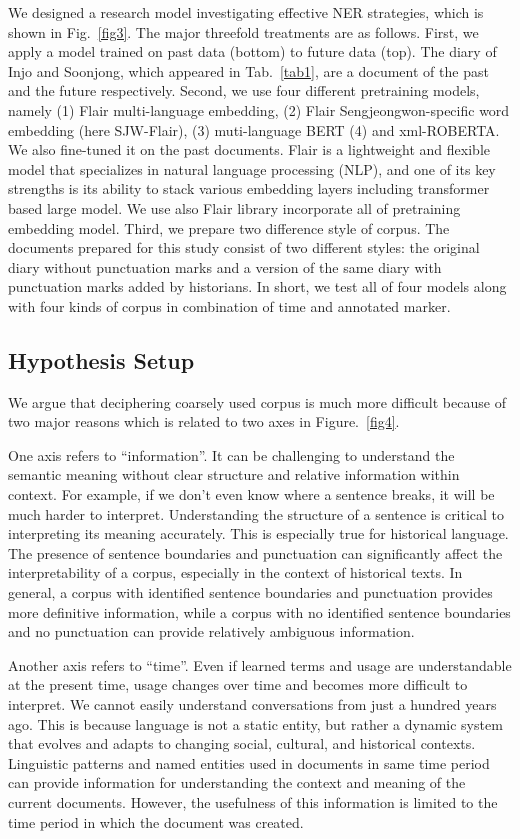 \documentclass[sigconf]{acmart}
\begin{document}
We designed a research model investigating effective NER strategies, which is shown in Fig.~\ref{fig3}. The major threefold treatments are as follows. First, we apply a model trained on past data (bottom) to future data (top). The diary of Injo and Soonjong, which appeared in Tab.~\ref{tab1}, are a document of the past and the future respectively.  Second, we use four different pretraining models, namely (1) Flair multi-language embedding, (2) Flair Sengjeongwon-specific word embedding (here SJW-Flair), (3) muti-language BERT (4) and xml-ROBERTA. We also fine-tuned it on the past documents. Flair is a lightweight and flexible model that specializes in natural language processing (NLP), and one of its key strengths is its ability to stack various embedding layers including transformer based large model. We use also Flair library incorporate all of pretraining embedding model. Third, we prepare two difference style of corpus. The documents prepared for this study consist of two different styles: the original diary without punctuation marks and a version of the same diary with punctuation marks added by historians. 
In short, we test all of four models along with four kinds of corpus in combination of time and annotated marker.



\subsection{Hypothesis Setup}

We argue that deciphering coarsely used corpus is much more difficult because of two major reasons which is related to two axes in Figure.~\ref{fig4}. 

One axis refers to “information”. It can be challenging to understand the semantic meaning without clear structure and relative information within context.   For example, if we don't even know where a sentence breaks, it will be much harder to interpret. Understanding the structure of a sentence is critical to interpreting its meaning accurately. This is especially true for historical language.  The presence of sentence boundaries and punctuation can significantly affect the interpretability of a corpus, especially in the context of historical texts. In general, a corpus with identified sentence boundaries and punctuation provides more definitive information, while a corpus with no identified sentence boundaries and no punctuation can provide relatively ambiguous information.

Another axis refers to “time”. Even if learned terms and usage are understandable at the present time, usage changes over time and becomes more difficult to interpret. We cannot easily understand conversations from just a hundred years ago. This is because language is not a static entity, but rather a dynamic system that evolves and adapts to changing social, cultural, and historical contexts. Linguistic patterns and named entities used in documents in same time period can provide information for understanding the context and meaning of the current documents. However, the usefulness of this information is limited to the time period in which the document was created.
\end{document}
